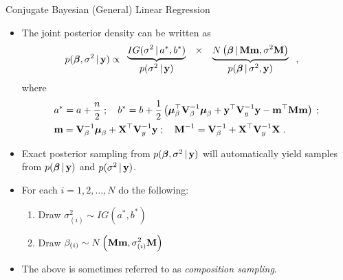 \begin{frame}{Conjugate Bayesian (General) Linear Regression}
 
\begin{itemize}\setlength{\itemsep}{0.1cm}
 \item The joint posterior density can be written as
\begin{align*}
 p(\mbox{\boldmath $ \beta $},\sigma^2 \,|\, \textbf{y}) &\propto
 \begin{array}{ccc}
  \underbrace{IG(\sigma^2\,|\, a^*, b^*)} & \times & \underbrace{N\left(\mbox{\boldmath $ \beta $} \,|\, \textbf{M}\textbf{m}, \sigma^2 \textbf{M}\right)}\\
  p(\sigma^2\,|\, \textbf{y}) & & p(\mbox{\boldmath $ \beta $}\,|\, \sigma^2, \textbf{y})
 \end{array}\; , 
\end{align*}
where 
\begin{align*}
& a^* = a + \frac{n}{2}\;;\quad b^* = b + \frac{1}{2}\left(\mbox{\boldmath $\mu$}_{\beta}^{\top}\textbf{V}_{\beta}^{-1}\mbox{\boldmath $\mu$}_{\beta} + \textbf{y}^{\top}\textbf{V}_y^{-1}\textbf{y} - \textbf{m}^{\top}\textbf{M}\textbf{m}\right)\;; \\ 
& \textbf{m} = \textbf{V}_{\beta}^{-1}\mbox{\boldmath $\mu$}_{\beta} + \textbf{X}^{\top}\textbf{V}_y^{-1}\textbf{y}\;;\quad \textbf{M}^{-1} = \textbf{V}_{\beta}^{-1} + \textbf{X}^{\top} \textbf{V}_y^{-1} \textbf{X}\; .   
\end{align*}

\item Exact posterior sampling from $p(\mbox{\boldmath $ \beta $}, \sigma^2 \,|\, \textbf{y})$ will automatically yield samples from $p(\mbox{\boldmath $ \beta $}\,|\, \textbf{y})$ and $p(\sigma^2\,|\, \textbf{y})$.

\item For each $i=1,2,\ldots,N$ do the following: 
 \begin{enumerate}
  \item Draw $\displaystyle \sigma^2_{(i)} \sim IG(a^*,b^*)$
  \item Draw $\displaystyle \beta_{(i)} \sim N\left(\textbf{M}\textbf{m}, \sigma^2_{(i)}\textbf{M}\right)$
 \end{enumerate}
 
 \item The above is sometimes referred to as \emph{composition sampling}.
\end{itemize}

\end{frame}

